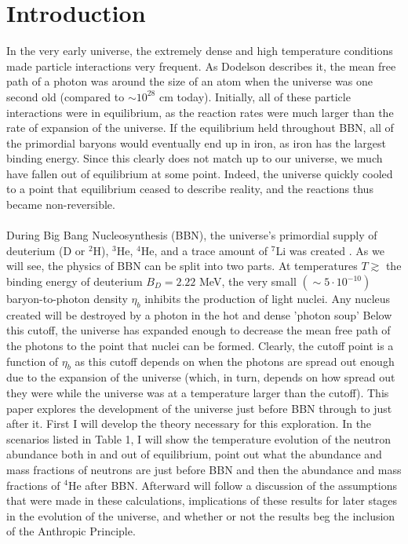 \documentclass[aps,reprint,prl]{revtex4-1}
\begin{document}
\section*{Introduction}
In the very early universe, the extremely dense and high temperature conditions made particle interactions very frequent.  As Dodelson \cite{Dodelson} describes it, the mean free path of a photon was around the size of an atom when the universe was one second old (compared to $\sim10^{28}$ cm today).  Initially, all of these particle interactions were in equilibrium, as the reaction rates were much larger than the rate of expansion of the universe.  If the equilibrium held throughout BBN, all of the primordial baryons would eventually end up in iron, as iron has the largest binding energy.  Since this clearly does not match up to our universe, we much have fallen out of equilibrium at some point.  Indeed, the universe quickly cooled to a point that equilibrium ceased to describe reality, and the reactions thus became non-reversible.  
\\ \\
 During Big Bang Nucleosynthesis (BBN), the universe's primordial supply of deuterium (D or $^2$H), $^3$He, $^4$He, and a trace amount of $^7$Li was created \cite{wiki:BBN}.  As we will see, the physics of BBN can be split into two parts.  At temperatures $T\gtrsim$ the binding energy of deuterium $B_D=2.22$ MeV,  the very small $\left(\sim5\cdot 10^{-10}\right)$ baryon-to-photon density $\eta_b$ inhibits the production of light nuclei.  Any nucleus created will be destroyed by a photon in the hot and dense 'photon soup'  Below this cutoff, the universe has expanded enough to decrease the mean free path of the photons to the point that nuclei can be formed.  Clearly, the cutoff point is a function of $\eta_b$ as this cutoff depends on when the photons are spread out enough due to the expansion of the universe (which, in turn, depends on how spread out they were while the universe was at a temperature larger than the cutoff).  This paper explores the development of the universe just before BBN through to just after it.  First I will develop the theory necessary for this exploration.  In the scenarios listed in Table 1, I will show the temperature evolution of the neutron abundance both in and out of equilibrium, point out what the abundance and mass fractions of neutrons are just before BBN and then the abundance and mass fractions of $^4$He after BBN.  Afterward will follow a discussion of the assumptions that were made in these calculations, implications of these results for later stages in the evolution of the universe, and whether or not the results beg the inclusion of the Anthropic Principle.
\end{document}
